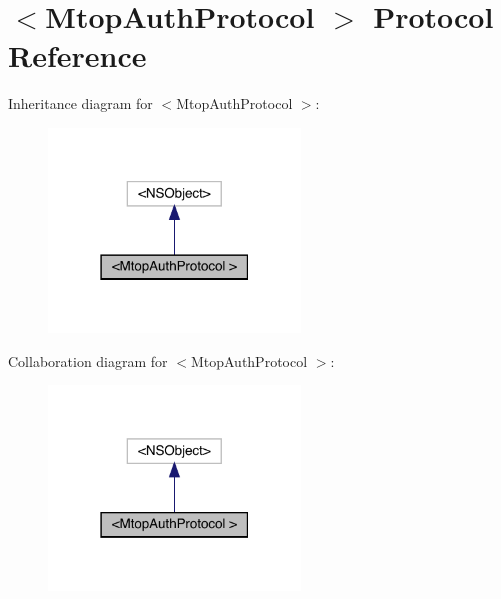 \hypertarget{protocol_mtop_auth_protocol_01-p}{}\section{$<$Mtop\+Auth\+Protocol $>$ Protocol Reference}
\label{protocol_mtop_auth_protocol_01-p}


Inheritance diagram for $<$Mtop\+Auth\+Protocol $>$\+:\nopagebreak
\begin{figure}[H]
\begin{center}
\leavevmode
\includegraphics[width=190pt]{protocol_mtop_auth_protocol_01-p__inherit__graph}
\end{center}
\end{figure}


Collaboration diagram for $<$Mtop\+Auth\+Protocol $>$\+:\nopagebreak
\begin{figure}[H]
\begin{center}
\leavevmode
\includegraphics[width=190pt]{protocol_mtop_auth_protocol_01-p__coll__graph}
\end{center}
\end{figure}
